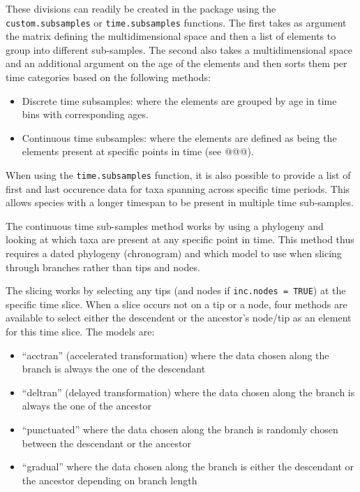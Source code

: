 \documentclass[12pt,letterpaper]{article}
\begin{document}
These divisions can readily be created in the package using the \texttt{custom.subsamples} or \texttt{time.subsamples} functions.
The first takes as argument the matrix defining the multidimensional space and then a list of elements to group into different sub-samples.
The second also takes a multidimensional space and an additional argument on the age of the elements and then sorts them per time categories based on the following methods:

\begin{itemize}
    \item Discrete time subsamples: where the elements are grouped by age in time bins with corresponding ages.
    \item Continuous time subsamples: where the elements are defined as being the elements present at specific points in time (see @@@).
\end{itemize}

When using the \texttt{time.subsamples} function, it is also possible to provide a list of first and last occurence data for taxa spanning across specific time periods.
This allows species with a longer timespan to be present in multiple time sub-samples.

The continuous time sub-samples method works by using a phylogeny and looking at which taxa are present at any specific point in time.
This method thus requires a dated phylogeny (chronogram) and which model to use when slicing through branches rather than tips and nodes.

The slicing works by selecting any tips (and nodes if \texttt{inc.nodes = TRUE}) at the specific time slice.
When a slice occurs not on a tip or a node, four methods are available to select either the descendent or the ancestor's node/tip as an element for this time slice.
The models are:
\begin{itemize}
    \item ``acctran'' (accelerated transformation) where the data chosen along the branch is always the one of the descendant
    \item ``deltran'' (delayed transformation) where the data chosen along the branch is always the one of the ancestor
    \item ``punctuated'' where the data chosen along the branch is randomly chosen between the descendant or the ancestor
    \item ``gradual'' where the data chosen along the branch is either the descendant or the ancestor depending on branch length
\end{itemize}
\end{document}
